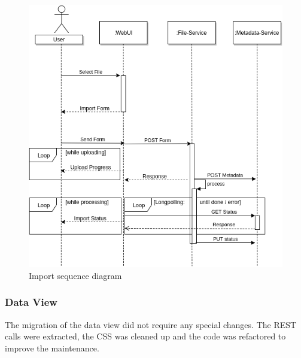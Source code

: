 \begin{figure}[H]
	\centering\includegraphics[width=.75\textwidth]{res/Import}
	\caption{Import sequence diagram}
	\label{fig:import}
\end{figure}


\subsubsection{Data View}
The migration of the data view did not require any special changes. The REST calls were extracted, the CSS was cleaned up and the code was refactored to improve the maintenance.

